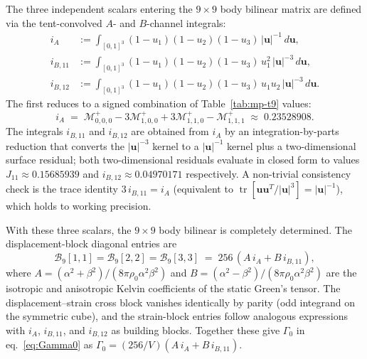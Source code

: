 \documentclass[11pt,a4paper]{article}
\newcommand{\bu}{\bm{u}}
\theoremstyle{plain}
\theoremstyle{definition}
\theoremstyle{remark}
\begin{document}
The three independent scalars entering the $9\times9$ body bilinear matrix
are defined via the tent-convolved $A$- and $B$-channel integrals:
\begin{align}
  i_A      &:= \int_{[0,1]^3}\!(1-u_1)(1-u_2)(1-u_3)\,|\bm{u}|^{-1}\,d\bm{u},
  \label{eq:iA}\\
  i_{B,11} &:= \int_{[0,1]^3}\!(1-u_1)(1-u_2)(1-u_3)\,u_1^2\,|\bm{u}|^{-3}\,d\bm{u},
  \label{eq:iB11}\\
  i_{B,12} &:= \int_{[0,1]^3}\!(1-u_1)(1-u_2)(1-u_3)\,u_1 u_2\,|\bm{u}|^{-3}\,d\bm{u}.
  \label{eq:iB12}
\end{align}
The first reduces to a signed combination of Table~\ref{tab:mp-t9} values:
\begin{equation}
  i_A \;=\; \mathcal{M}^+_{0,0,0}
          - 3\mathcal{M}^+_{1,0,0}
          + 3\mathcal{M}^+_{1,1,0}
          - \mathcal{M}^+_{1,1,1}
       \;\approx\; 0.23528908.
  \label{eq:iA-value}
\end{equation}
The integrals $i_{B,11}$ and $i_{B,12}$ are obtained from $i_A$ by an
integration-by-parts reduction that converts the $|\bu|^{-3}$ kernel to a
$|\bu|^{-1}$ kernel plus a two-dimensional surface residual; both two-dimensional
residuals evaluate in closed form to values $J_{11} \approx 0.15685939$ and
$i_{B,12} \approx 0.04970171$ respectively.  A non-trivial consistency check
is the trace identity $3\,i_{B,11} = i_A$ (equivalent to $\operatorname{tr}[\bu\bu^T/|\bu|^3] = |\bu|^{-1}$),
which holds to working precision.

With these three scalars, the $9\times9$ body bilinear is completely
determined.  The displacement-block diagonal entries are
\begin{equation}
  \mathcal{B}_9[1,1] = \mathcal{B}_9[2,2] = \mathcal{B}_9[3,3]
  \;=\; 256\,(A\,i_A + B\,i_{B,11}),
  \label{eq:B9-disp-diag}
\end{equation}
where $A = (\alpha^2+\beta^2)/(8\pi\rho_0\alpha^2\beta^2)$ and
$B = (\alpha^2-\beta^2)/(8\pi\rho_0\alpha^2\beta^2)$ are the isotropic
and anisotropic Kelvin coefficients of the static Green's tensor.
The displacement--strain cross block vanishes identically by parity
(odd integrand on the symmetric cube), and the strain-block entries follow
analogous expressions with $i_A$, $i_{B,11}$, and $i_{B,12}$ as building
blocks.  Together these give $\Gamma_0$ in eq.~\eqref{eq:Gamma0}
as $\Gamma_0 = (256/V)(A\,i_A + B\,i_{B,11})$.

\printbibliography
\end{document}

